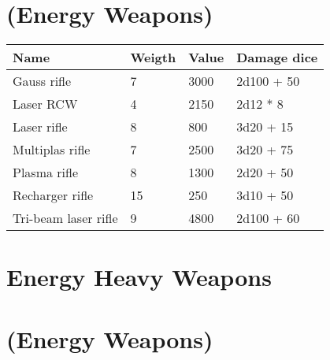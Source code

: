 \documentclass{report}
\begin{document}
\begin{table}[H]
\begin{table}[H]
\begin{table}[H]
\begin{table}[H]
\begin{table}[H]
\begin{table}[H]
\chapter{(Energy Weapons)}
\begin{table}[H]
  \centering
  \begin{tabular}{p{30mm}p{30mm}p{30mm}p{30mm}}
\bfseries Name & \bfseries Weigth & \bfseries Value & \bfseries Damage dice \\
\hline
Gauss rifle  & 7 & 3000 & 2d100 + 50 \\
Laser RCW  & 4 & 2150 & 2d12 * 8 \\
Laser rifle  & 8 & 800 & 3d20 + 15 \\
Multiplas rifle  & 7 & 2500 & 3d20 + 75 \\
Plasma rifle  & 8 & 1300 & 2d20 + 50 \\
Recharger rifle  & 15 & 250 & 3d10 + 50 \\
Tri-beam laser rifle & 9 & 4800 & 2d100 + 60 \\
  \end{tabular}
\chapter{Energy Heavy Weapons }
\chapter{(Energy Weapons)}

\end{table}
\end{table}
\end{table}
\end{table}
\end{table}
\end{table}
\end{table}
\end{document}
